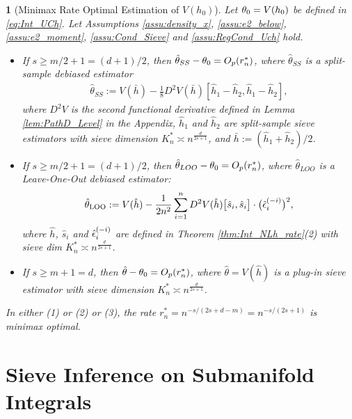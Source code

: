 \documentclass[12pt,american]{article}
\theoremstyle{definition}
\theoremstyle{plain}
\theoremstyle{definition}
\theoremstyle{plain}
\theoremstyle{plain}
\newtheorem{thm}{\protect\theoremname}
\theoremstyle{plain}
\theoremstyle{plain}
\theoremstyle{plain}
\providecommand{\theoremname}{Theorem}
\providecommand{\theoremname}{Theorem}
\begin{document}
\begin{thm}[Minimax Rate Optimal Estimation of $V(h_0)$]
  \label{thm:Int_UCh_rate} Let $\theta_0=V(h_0)$ be defined in \eqref{eq:Int_UCh}. Let Assumptions \ref{assu:density_x}, \ref{assu:e2_below}, \ref{assu:e2_moment}, \ref{assu:Cond_Sieve} and \ref{assu:RegCond_Uch} hold.
  \begin{itemize}
    \item[(1)]  If $s\geq m/2 +1=(d+1)/2$, then $\hat{\theta}_{SS}-\theta_0=O_p(r_n^*)$, where $\hat{\theta}_{SS}$ is a split-sample debiased estimator
      \begin{align}
        \hat{\theta}_{SS} := V\left(\bar{h}\right) - \frac{1}{8} D^2V(\bar{h})\left[\hat{h}_1 - \hat{h}_2, \hat{h}_1 - \hat{h}_2\right],
      \end{align}
      where $D^2V$ is the second functional derivative defined in Lemma \ref{lem:PathD_Level} in the Appendix, $\hat{h}_1$ and $\hat{h}_2$ are split-sample sieve estimators with sieve dimension $K_{n}^{*}\asymp n^{\frac{d}{2s+1}}$, and $\bar{h} := (\hat{h}_1 + \hat{h}_2)/2$.
    \item[(2)] If $s\geq m/2 +1=(d+1)/2$, then $\hat{\theta}_{LOO}-\theta_0=O_p(r_n^*)$, where $\hat{\theta}_{LOO}$ is a Leave-One-Out debiased estimator:
      \begin{equation}\label{eq:V_LOO_estimator}
        \hat{\theta}_{\mathrm{LOO}}
        := V(\hat h)
        -\frac{1}{2n^2}\sum_{i=1}^n D^2V(\hat h)\big[\hat s_i,\hat s_i\big]\cdot \big(\hat{\epsilon}_i^{(-i)}\big)^2,
      \end{equation}
      where $\hat{h}$, $\hat s_i$ and $\hat{\epsilon}_i^{(-i)}$ are defined in Theorem \ref{thm:Int_NLh_rate}(2) with sieve dim $K_{n}^{*}\asymp n^{\frac{d}{2s+1}}$.
    \item[(3)] If $s\geq m+1=d$, then $\hat{\theta}-\theta_0=O_p(r_n^*)$, where $\hat{\theta}=V(\hat{h})$ is a plug-in sieve estimator with sieve dimension $K_{n}^{*}\asymp n^{\frac{d}{2s+1}}$.
  \end{itemize}
  In either (1) or (2) or (3), the rate $r_n^*=n^{-s/(2s+d-m)}=n^{-s/(2s+1)}$ is minimax optimal.
\end{thm}

\section{\label{sec:Nonlinear} Sieve Inference on Submanifold Integrals}
\end{document}
